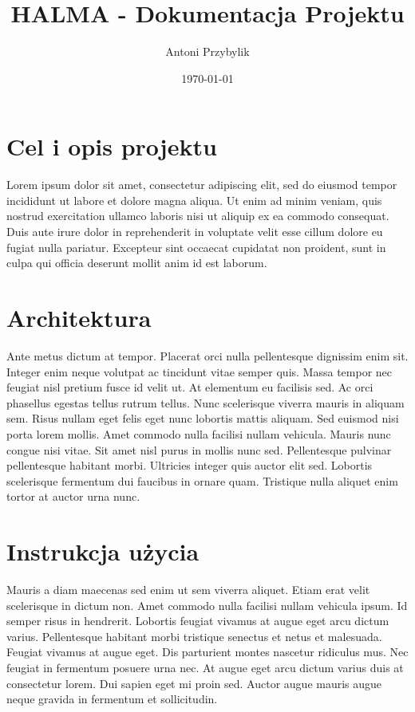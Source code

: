 \documentclass[12pt, titlepage]{article}
\author{Antoni Przybylik}
\date{\today}
\title{HALMA - Dokumentacja Projektu}
\begin{document}
\maketitle
\justifying

\section{Cel i opis projektu}
Lorem ipsum dolor sit amet, consectetur adipiscing elit, sed do eiusmod tempor incididunt ut labore et dolore magna aliqua. Ut enim ad minim veniam, quis nostrud exercitation ullamco laboris nisi ut aliquip ex ea commodo consequat. Duis aute irure dolor in reprehenderit in voluptate velit esse cillum dolore eu fugiat nulla pariatur. Excepteur sint occaecat cupidatat non proident, sunt in culpa qui officia deserunt mollit anim id est laborum.

\section{Architektura}
Ante metus dictum at tempor. Placerat orci nulla pellentesque dignissim enim sit. Integer enim neque volutpat ac tincidunt vitae semper quis. Massa tempor nec feugiat nisl pretium fusce id velit ut. At elementum eu facilisis sed. Ac orci phasellus egestas tellus rutrum tellus. Nunc scelerisque viverra mauris in aliquam sem. Risus nullam eget felis eget nunc lobortis mattis aliquam. Sed euismod nisi porta lorem mollis. Amet commodo nulla facilisi nullam vehicula. Mauris nunc congue nisi vitae. Sit amet nisl purus in mollis nunc sed. Pellentesque pulvinar pellentesque habitant morbi. Ultricies integer quis auctor elit sed. Lobortis scelerisque fermentum dui faucibus in ornare quam. Tristique nulla aliquet enim tortor at auctor urna nunc.

\section{Instrukcja użycia}
Mauris a diam maecenas sed enim ut sem viverra aliquet. Etiam erat velit scelerisque in dictum non. Amet commodo nulla facilisi nullam vehicula ipsum. Id semper risus in hendrerit. Lobortis feugiat vivamus at augue eget arcu dictum varius. Pellentesque habitant morbi tristique senectus et netus et malesuada. Feugiat vivamus at augue eget. Dis parturient montes nascetur ridiculus mus. Nec feugiat in fermentum posuere urna nec. At augue eget arcu dictum varius duis at consectetur lorem. Dui sapien eget mi proin sed. Auctor augue mauris augue neque gravida in fermentum et sollicitudin.
\end{document}
